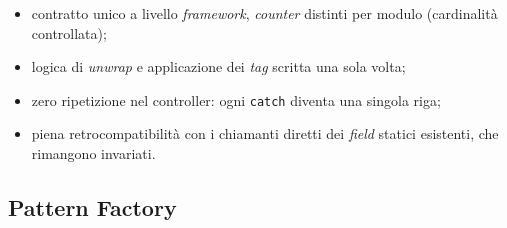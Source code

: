 \begin{itemize}
      \item contratto unico a livello \emph{framework}, \emph{counter}
            distinti per modulo (cardinalità controllata);
      \item logica di \emph{unwrap} e applicazione dei \emph{tag} scritta una
            sola volta;
      \item zero ripetizione nel controller: ogni \texttt{catch} diventa una
            singola riga;
      \item piena retrocompatibilità con i chiamanti diretti dei \emph{field}
            statici esistenti, che rimangono invariati.
\end{itemize}

\subsection{Pattern Factory}

